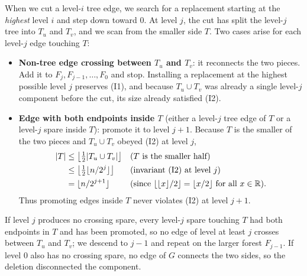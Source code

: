 \begin{whybox}
When we cut a level-$i$ tree edge, we search for a replacement starting at the
\emph{highest} level $i$ and step down toward $0$. At level $j$, the cut has split the
level-$j$ tree into $T_u$ and $T_v$, and we scan from the smaller side $T$. Two cases
arise for each level-$j$ edge touching $T$:
\begin{itemize}
  \item \textbf{Non-tree edge crossing between $T_u$ and $T_v$}: it reconnects the two
        pieces. Add it to $F_j, F_{j-1}, \dots, F_0$ and stop. Installing a replacement
        at the highest possible level $j$ preserves (I1), and because $T_u \cup T_v$
        was already a single level-$j$ component before the cut, its size already
        satisfied (I2).
  \item \textbf{Edge with both endpoints inside $T$} (either a level-$j$ tree edge of
        $T$ or a level-$j$ spare inside $T$): promote it to level $j+1$. Because $T$ is
        the smaller of the two pieces and $T_u \cup T_v$ obeyed (I2) at level $j$,
        \begin{align*}
          \lvert T\rvert
            &\le \bigl\lfloor \tfrac{1}{2}\lvert T_u \cup T_v\rvert \bigr\rfloor
              &&\text{($T$ is the smaller half)} \\
            &\le \bigl\lfloor \tfrac{1}{2}\lfloor n / 2^j\rfloor \bigr\rfloor
              &&\text{(invariant (I2) at level $j$)} \\
            &= \lfloor n / 2^{j+1}\rfloor
              &&\text{(since $\lfloor\lfloor x\rfloor/2\rfloor = \lfloor x/2\rfloor$ for all $x \in \mathbb{R}$)}.
        \end{align*}
        Thus promoting edges inside $T$ never violates (I2) at level $j+1$.
\end{itemize}
If level $j$ produces no crossing spare, every level-$j$ spare touching $T$ had both
endpoints in $T$ and has been promoted, so no edge of level at least $j$ crosses between
$T_u$ and $T_v$; we descend to $j-1$ and repeat on the larger forest $F_{j-1}$. If level
$0$ also has no crossing spare, no edge of $G$ connects the two sides, so the deletion
disconnected the component.
\end{whybox}

